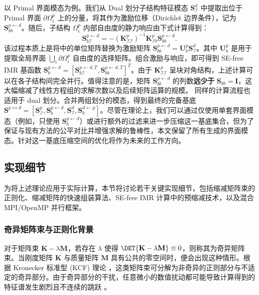 以 Primal 界面模态为例。我们从 Dual 划分子结构特征模态 $\mathbf{S}_{\mathcal{I}}^d$ 中提取出位于 Primal 界面 $\partial \Omega_i^p$ 上的分量，将其作为激励位移（Dirichlet 边界条件），记为 $\mathbf{S}_{bb}^{p\leftarrow d}$。随后，子结构 $\Omega_i^p$ 内部自由度的静力响应由下式计算得到：
\begin{equation}
  \mathbf{S}_{b\mathcal{I}}^{p\leftarrow d} = -
  (\mathbf{K}_{\mathcal{I}\mathcal{I}}^p)^{-1} \mathbf{K}_{\mathcal{I}b}^p
  \mathbf{S}_{bb}^{p\leftarrow d}.
  \label{eq:ours-response-solution}
\end{equation}
该过程本质上是将中的单位矩阵替换为激励矩阵 $\mathbf{S}_{bb}^{p \leftarrow d} = \mathbf{U}_b^p \mathbf{S}_{\mathcal{I}}^d$。其中 $\mathbf{U}_b^p$ 是用于提取全局界面 $\bigcup_i \partial \Omega_i^p$ 自由度的选择矩阵。组合激励与响应，即可得到 SE-free IMR 基函数 $\mathbf{S}_b^{p\leftarrow d}= [\mathbf{S}_{b\mathcal{I}}^{p\leftarrow d, T}, \mathbf{S}_{bb}^{p\leftarrow d,T}]^T$。由于 $\mathbf{K}^p_{\mathcal{II}}$ 呈块对角结构，上述计算可以在各子结构间完全并行。\textcolor{ExplainConclusion}{值得注意的是，矩阵 $\mathbf{S}_{bb}^{p \leftarrow d}$ 的列数\textbf{远少于} $\mathbf{S}_{bb}=\mathbf{I}$，这大幅缩减了线性方程组的求解次数以及后续矩阵运算的规模。} 同样的计算流程也适用于 dual 划分。合并两组划分的模态，得到最终的完备基底 $\mathbf{S}^{p\leftrightarrow d}=[\mathbf{S}^p_{\mathcal{I}}, \mathbf{S}_{b}^{p\leftarrow d}, \mathbf{S}^d_{\mathcal{I}},\mathbf{S}_{b}^{d\leftarrow p} ]$。尽管在理论上，我们可以通过仅使用单套界面模态（例如，只使用 $\mathbf{S}_{b}^{p\leftarrow d}$）或进行额外的过滤来进一步压缩这一基底集合，但为了保证与现有方法的公平对比并增强求解的鲁棒性，本文保留了所有生成的界面模态。针对这一基底压缩空间的优化将作为未来的工作方向。

\subsection{实现细节}\label{sec:implementation}

为将上述理论应用于实际计算，本节将讨论若干关键实现细节，包括缩减矩阵束的正则化、缩减矩阵的快速组装算法、SE-free IMR 计算中的预缩减技术，以及混合 MPI/OpenMP 并行框架。

\subsubsection{奇异矩阵束与正则化背景} \label{sec:regularization-background}

对于矩阵束 $\mathbf{K} - \lambda \mathbf{M}$，若存在 $\lambda$ 使得 $\DET{\mathbf{K} - \lambda \mathbf{M}} \equiv 0$，则称其为奇异矩阵束。当刚度矩阵 $\mathbf{K}$ 与质量矩阵 $\mathbf{M}$ 具有公共的零空间时，便会出现这种情形。根据 Kronecker 标准型 (KCF) 理论 \cite{gantmakher2000theory, Van1979Kronecker, Berger2012QuasiKroneckerFrom}，这类矩阵束可分解为非奇异的正则部分与不适定的奇异部分。由于奇异部分的干扰，任意微小的数值扰动都可能导致计算得到的特征谱发生剧烈且不连续的跳跃 \cite{Hochstenbach2019SolvingSingular, Kressner2024AnalysisOfeigenvalue}。


